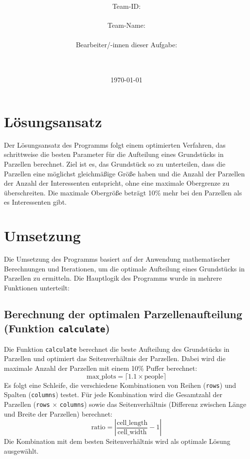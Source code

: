 \documentclass[a4paper,10pt,ngerman]{scrartcl}
\title{\textbf{\Huge\Aufgabe}}
\author{\LARGE Team-ID: \LARGE \TeamId \\\\
	\LARGE Team-Name: \LARGE \TeamName \\\\
	\LARGE Bearbeiter/-innen dieser Aufgabe: \\ 
	\LARGE \Namen\\\\}
\date{\LARGE\today}
\begin{document}
	
	\maketitle
	\tableofcontents
	
	\vspace{0.5cm}
	
	\section{Lösungsansatz}
	Der Lösungsansatz des Programms folgt einem optimierten Verfahren, das schrittweise die besten Parameter für 
	die Aufteilung eines Grundstücks in Parzellen berechnet. Ziel ist es, das Grundstück so zu unterteilen, dass 
	die Parzellen eine möglichst gleichmäßige Größe haben und die Anzahl der Parzellen der Anzahl der 
	Interessenten entspricht, ohne eine maximale Obergrenze zu überschreiten. Die maximale Obergröße beträgt 10\%
	mehr bei den Parzellen als es Interessenten gibt.
	
		
	\section{Umsetzung}
	
	Die Umsetzung des Programms basiert auf der Anwendung mathematischer Berechnungen und Iterationen, um die optimale Aufteilung eines Grundstücks in Parzellen zu ermitteln. Die Hauptlogik des Programms wurde in mehrere Funktionen unterteilt:
	
	\subsection{Berechnung der optimalen Parzellenaufteilung (Funktion \texttt{calculate})}
	
	Die Funktion \texttt{calculate} berechnet die beste Aufteilung des Grundstücks in Parzellen und optimiert das Seitenverhältnis der Parzellen. Dabei wird die maximale Anzahl der Parzellen mit einem 10\% Puffer berechnet:
	\[
	\text{max\_plots} = \lceil 1.1 \times \text{people} \rceil
	\]
	Es folgt eine Schleife, die verschiedene Kombinationen von Reihen (\texttt{rows}) und Spalten (\texttt{columns}) testet. Für jede Kombination wird die Gesamtzahl der Parzellen (\texttt{rows} $\times$ \texttt{columns}) sowie das Seitenverhältnis (Differenz zwischen Länge und Breite der Parzellen) berechnet:
	\[
	\text{ratio} = \left| \frac{\text{cell\_length}}{\text{cell\_width}} - 1 \right|
	\]
	Die Kombination mit dem besten Seitenverhältnis wird als optimale Lösung ausgewählt.
	
\end{document}

